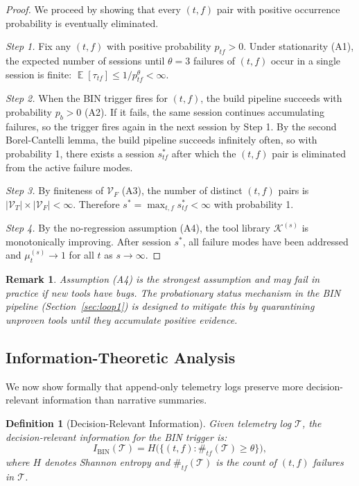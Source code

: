 \documentclass[11pt]{article}
\newtheorem{definition}{Definition}
\newtheorem{remark}{Remark}
\DeclareMathOperator{\E}{\mathbb{E}}
\begin{document}
\begin{proof}
We proceed by showing that every $(t,f)$ pair with positive occurrence
probability is eventually eliminated.

\textit{Step 1.} Fix any $(t, f)$ with positive probability $p_{tf} > 0$.
Under stationarity (A1), the expected number of sessions until $\theta = 3$
failures of $(t, f)$ occur in a single session is finite:
$\E[\tau_{tf}] \leq 1 / p_{tf}^\theta < \infty$.

\textit{Step 2.} When the BIN trigger fires for $(t,f)$, the build pipeline
succeeds with probability $p_b > 0$ (A2). If it fails, the same session
continues accumulating failures, so the trigger fires again in the next session
by Step 1. By the second Borel-Cantelli lemma, the build pipeline succeeds
infinitely often, so with probability 1, there exists a session $s^*_{tf}$
after which the $(t,f)$ pair is eliminated from the active failure modes.

\textit{Step 3.} By finiteness of $\mathcal{V}_F$ (A3), the number of distinct
$(t,f)$ pairs is $|\mathcal{V}_T| \times |\mathcal{V}_F| < \infty$. Therefore
$s^* = \max_{t,f} s^*_{tf} < \infty$ with probability 1.

\textit{Step 4.} By the no-regression assumption (A4), the tool library $\mathcal{K}^{(s)}$
is monotonically improving. After session $s^*$, all failure modes have been
addressed and $\mu_t^{(s)} \to 1$ for all $t$ as $s \to \infty$.
\end{proof}

\begin{remark}
Assumption (A4) is the strongest assumption and may fail in practice if new
tools have bugs. The probationary status mechanism in the BIN pipeline
(Section~\ref{sec:loop1}) is designed to mitigate this by quarantining
unproven tools until they accumulate positive evidence.
\end{remark}

\subsection{Information-Theoretic Analysis}
\label{sec:info_theory}

We now show formally that append-only telemetry logs preserve more
decision-relevant information than narrative summaries.

\begin{definition}[Decision-Relevant Information]
\label{def:relevant_info}
Given telemetry log $\mathcal{T}$, the decision-relevant information for the
BIN trigger is:
\begin{equation}
I_{\text{BIN}}(\mathcal{T}) = H\bigl(\{(t,f) : \#_{tf}(\mathcal{T}) \geq \theta\}\bigr),
\end{equation}
where $H$ denotes Shannon entropy and $\#_{tf}(\mathcal{T})$ is the count of
$(t,f)$ failures in $\mathcal{T}$.
\end{definition}
\end{document}
